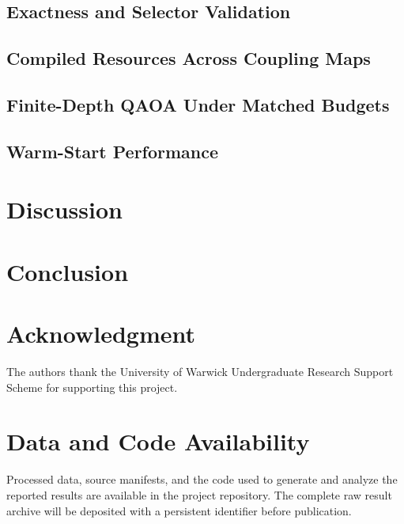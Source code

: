 \documentclass{ieeeaccess}
\begin{document}
\subsection{Exactness and Selector Validation}
\label{sec:experiments:validation}

\subsection{Compiled Resources Across Coupling Maps}
\label{sec:experiments:resources}

\subsection{Finite-Depth QAOA Under Matched Budgets}
\label{sec:experiments:qaoa}

\subsection{Warm-Start Performance}
\label{sec:experiments:warmstart}


\section{Discussion}
\label{sec:discussion}

\section{Conclusion}
\label{sec:conclusion}

\section*{Acknowledgment}
The authors thank the University of Warwick Undergraduate Research Support Scheme
for supporting this project.

\section*{Data and Code Availability}
Processed data, source manifests, and the code used to generate and analyze the
reported results are available in the project repository. The complete raw result
archive will be deposited with a persistent identifier before publication.





\EOD
\end{document}
